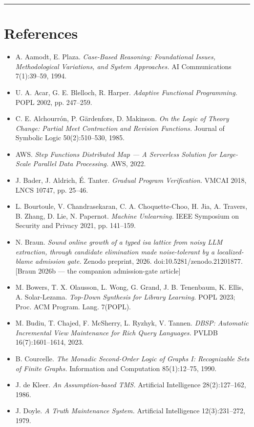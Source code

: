 \documentclass[11pt]{article}
\begin{document}
\medskip\hrule\medskip

\section*{References}

\begin{itemize}
\item A. Aamodt, E. Plaza. \emph{Case-Based Reasoning: Foundational Issues, Methodological Variations, and System Approaches.} AI Communications 7(1):39–59, 1994.
\item U. A. Acar, G. E. Blelloch, R. Harper. \emph{Adaptive Functional Programming.} POPL 2002, pp. 247–259.
\item C. E. Alchourrón, P. Gärdenfors, D. Makinson. \emph{On the Logic of Theory Change: Partial Meet Contraction and Revision Functions.} Journal of Symbolic Logic 50(2):510–530, 1985.
\item AWS. \emph{Step Functions Distributed Map — A Serverless Solution for Large-Scale Parallel Data Processing.} AWS, 2022.
\item J. Bader, J. Aldrich, É. Tanter. \emph{Gradual Program Verification.} VMCAI 2018, LNCS 10747, pp. 25–46.
\item L. Bourtoule, V. Chandrasekaran, C. A. Choquette-Choo, H. Jia, A. Travers, B. Zhang, D. Lie, N. Papernot. \emph{Machine Unlearning.} IEEE Symposium on Security and Privacy 2021, pp. 141–159.
\item N. Braun. \emph{Sound online growth of a typed isa lattice from noisy LLM extraction, through candidate elimination made noise-tolerant by a localized-blame admission gate.} Zenodo preprint, 2026. doi:10.5281/zenodo.21201877. [Braun 2026b — the companion admission-gate article]
\item M. Bowers, T. X. Olausson, L. Wong, G. Grand, J. B. Tenenbaum, K. Ellis, A. Solar-Lezama. \emph{Top-Down Synthesis for Library Learning.} POPL 2023; Proc. ACM Program. Lang. 7(POPL).
\item M. Budiu, T. Chajed, F. McSherry, L. Ryzhyk, V. Tannen. \emph{DBSP: Automatic Incremental View Maintenance for Rich Query Languages.} PVLDB 16(7):1601–1614, 2023.
\item B. Courcelle. \emph{The Monadic Second-Order Logic of Graphs I: Recognizable Sets of Finite Graphs.} Information and Computation 85(1):12–75, 1990.
\item J. de Kleer. \emph{An Assumption-based TMS.} Artificial Intelligence 28(2):127–162, 1986.
\item J. Doyle. \emph{A Truth Maintenance System.} Artificial Intelligence 12(3):231–272, 1979.

\end{itemize}
\end{document}
